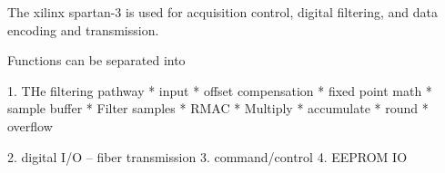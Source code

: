 The xilinx spartan-3 is used for acquisition control, digital filtering, and data encoding and transmission. 


Functions can be separated into

1. THe filtering pathway
  * input
  * offset compensation
  * fixed point math
  * sample buffer
  * Filter samples
  * RMAC
     * Multiply
     * accumulate
     * round 
     * overflow
  
2. digital I/O -- fiber transmission
3. command/control
4. EEPROM IO
